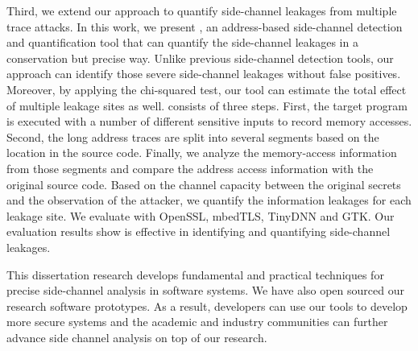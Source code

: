 Third, we extend our approach to quantify side-channel leakages from multiple trace attacks. In this work, we present \ctool{}, an address-based side-channel detection and quantification tool that can quantify the side-channel leakages in a conservation but precise way. Unlike previous side-channel detection tools, our approach can identify those severe side-channel leakages without false positives. Moreover, by applying the chi-squared test, our tool can estimate the total effect of multiple leakage sites as well. \ctool{} consists of three steps. First, the target program is executed with a number of different sensitive inputs to record memory accesses. Second, the long address traces are split into several segments based on the location in the source code. Finally, we analyze the memory-access information from those segments and compare the address access information with the original source code. Based on the channel capacity between the original secrets and the observation of the attacker, we quantify the information leakages for each leakage site. We evaluate \ctool{} with OpenSSL, mbedTLS, TinyDNN and GTK. Our evaluation results show \ctool{} is effective in identifying and quantifying side-channel leakages.


This dissertation research develops fundamental and practical techniques for precise side-channel 
analysis in software systems. We have also open sourced our research software prototypes.
As a result, developers can use our tools to develop more secure systems and the academic and industry
communities can further advance side channel analysis on top of our research.
